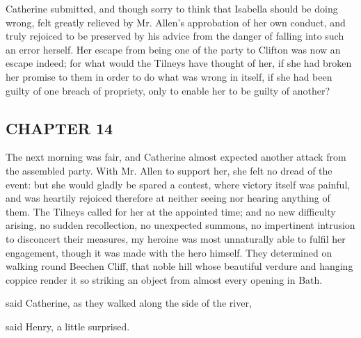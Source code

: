Catherine submitted, and though sorry to think that Isabella should be doing wrong, felt greatly relieved by Mr. Allen's approbation of her own conduct, and truly rejoiced to be preserved by his advice from the danger of falling into such an error herself. Her escape from being one of the party to Clifton was now an escape indeed; for what would the Tilneys have thought of her, if she had broken her promise to them in order to do what was wrong in itself, if she had been guilty of one breach of propriety, only to enable her to be guilty of another?

\subsection[chapter-14]{\useURL[url16][][][]\from[url16]CHAPTER 14}

The next morning was fair, and Catherine almost expected another attack from the assembled party. With Mr. Allen to support her, she felt no dread of the event: but she would gladly be spared a contest, where victory itself was painful, and was heartily rejoiced therefore at neither seeing nor hearing anything of them. The Tilneys called for her at the appointed time; and no new difficulty arising, no sudden recollection, no unexpected summons, no impertinent intrusion to disconcert their measures, my heroine was most unnaturally able to fulfil her engagement, though it was made with the hero himself. They determined on walking round Beechen Cliff, that noble hill whose beautiful verdure and hanging coppice render it so striking an object from almost every opening in Bath.

 said Catherine, as they walked along the side of the river, 

 said Henry, a little surprised.





